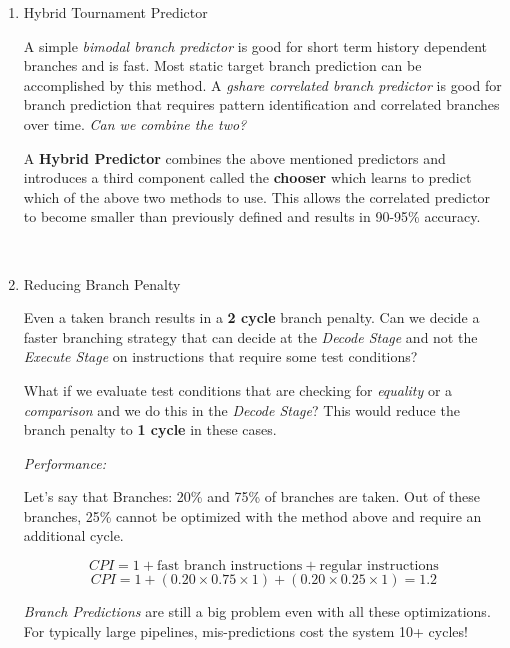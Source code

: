 \documentclass[12pt]{article}
\newenvironment{QandA}{\begin{enumerate}[label=\bfseries\arabic*.]\bfseries}
                      {\end{enumerate}}
\newenvironment{answered}{\par\quad\normalfont}{}
\begin{document}
\begin{QandA}
\ 

\item Hybrid Tournament Predictor
\begin{answered}
A simple \textit{bimodal branch predictor} is good for short term history dependent branches and is fast. Most static target branch prediction can be accomplished by this method. A \textit{gshare correlated branch predictor} is good for branch prediction that requires pattern identification and correlated branches over time. \textit{Can we combine the two?}

A \textbf{Hybrid Predictor} combines the above mentioned predictors and introduces a third component called the \textbf{chooser} which learns to predict which of the above two methods to use. This allows the correlated predictor to become smaller than previously defined and results in 90-95\% accuracy. 
\end{answered}

\

\item Reducing Branch Penalty
\begin{answered}
Even a taken branch results in a \textbf{2 cycle} branch penalty. Can we decide a faster branching strategy that can decide at the \textit{Decode Stage} and not the \textit{Execute Stage} on instructions that require some test conditions?

What if we evaluate test conditions that are checking for \textit{equality} or a \textit{comparison} and we do this in the \textit{Decode Stage}? This would reduce the branch penalty to \textbf{1 cycle} in these cases.

\textit{Performance:}

Let's say that Branches: 20\% and 75\% of branches are taken. Out of these branches, 25\% cannot be optimized with the method above and require an additional cycle.

\begin{equation*}
    CPI = 1 + \text{fast branch instructions} + \text{regular instructions}
\end{equation*}
\begin{equation*}
    CPI = 1 + (0.20 \times 0.75 \times 1) + (0.20 \times 0.25 \times 1) = 1.2
\end{equation*}

\textit{Branch Predictions} are still a big problem even with all these optimizations. For typically large pipelines, mis-predictions cost the system 10+ cycles!
\end{answered}


\end{QandA}
\end{document}
